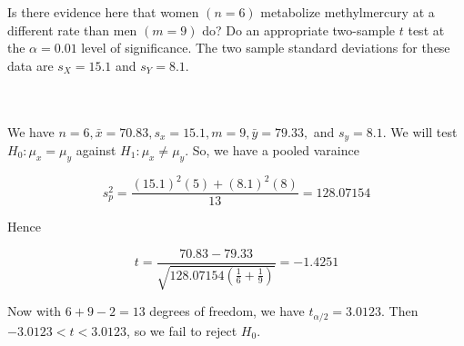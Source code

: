 Is there evidence here that women $(n=6)$ metabolize methylmercury at a different rate than men
$(m=9)$ do? Do an appropriate two-sample $t$ test at the $\alpha=0.01$ level of significance. The two
sample standard deviations for these data are $s_X=15.1$ and $s_Y=8.1$.\\\\

\begin{solution}\renewcommand{\qedsymbol}{}\ \\
    We have $n=6, \bar{x}=70.83, s_x=15.1, m=9, \bar{y}=79.33,$ and $s_y=8.1$. We will test
    $H_0:\mu_x=\mu_y$ against $H_1:\mu_x\neq\mu_y$. So, we have a pooled varaince
    
    $$s_p^2=\frac{(15.1)^2(5)+(8.1)^2(8)}{13}=128.07154$$
    
    Hence
    
    $$t=\frac{70.83-79.33}{\sqrt{128.07154(\frac{1}{6}+\frac{1}{9})}}=-1.4251$$
    
    Now with $6+9-2=13$ degrees of freedom, we have $t_{\alpha/2}=3.0123$. Then $-3.0123<t<3.0123$, so
    we fail to reject $H_0$.

\end{solution}